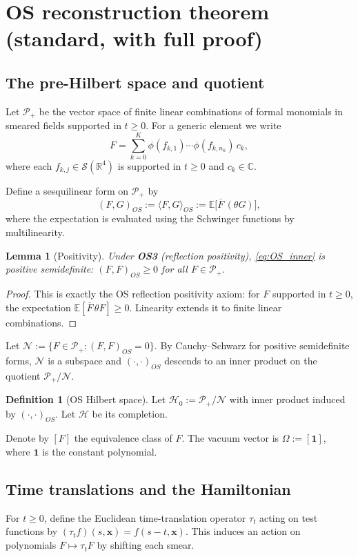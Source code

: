 \documentclass[11pt]{article}
\newtheorem{lemma}[theorem]{Lemma}
\theoremstyle{definition}
\newtheorem{definition}[theorem]{Definition}
\newcommand{\E}{\mathbb{E}}
\newcommand{\1}{\mathbf{1}}
\newcommand{\R}{\mathbb{R}}
\newcommand{\cH}{\mathcal{H}}
\newcommand{\cS}{\mathcal{S}}
\newcommand{\C}{\mathbb{C}}
\newcommand{\cP}{\mathcal{P}}
\begin{document}
\section{OS reconstruction theorem (standard, with full proof)}

\subsection{The pre-Hilbert space and quotient}
Let \(\cP_+\) be the vector space of finite linear combinations of formal monomials in smeared fields supported in \(t\ge 0\). For a generic element we write
\[
F = \sum_{k=0}^K \phi(f_{k,1})\cdots \phi(f_{k,n_k})\, c_k,
\]
where each \(f_{k,j}\in \cS(\R^4)\) is supported in \(t\ge 0\) and \(c_k\in\C\).

Define a sesquilinear form on \(\cP_+\) by
\begin{equation}\label{eq:OS_inner}
(F,G)_{OS} := \langle F,G\rangle_{OS} := \E\big[\overline{F}\, (\theta G)\big],
\end{equation}
where the expectation is evaluated using the Schwinger functions by multilinearity.

\begin{lemma}[Positivity]
Under \textbf{OS3} (reflection positivity), \eqref{eq:OS_inner} is positive semidefinite: \((F,F)_{OS}\ge 0\) for all \(F\in\cP_+\).
\end{lemma}

\begin{proof}
This is exactly the OS reflection positivity axiom: for \(F\) supported in \(t\ge 0\), the expectation \(\E[\overline{F}\, \theta F]\ge 0\). Linearity extends it to finite linear combinations.
\end{proof}

Let \(\mathcal{N}:=\{F\in\cP_+: (F,F)_{OS}=0\}\). By Cauchy--Schwarz for positive semidefinite forms, \(\mathcal{N}\) is a subspace and \((\cdot,\cdot)_{OS}\) descends to an inner product on the quotient \(\cP_+/\mathcal{N}\).

\begin{definition}[OS Hilbert space]
Let \(\cH_0:=\cP_+/\mathcal{N}\) with inner product induced by \((\cdot,\cdot)_{OS}\). Let \(\cH\) be its completion.
\end{definition}

Denote by \([F]\) the equivalence class of \(F\). The vacuum vector is \(\Omega:=[\1]\), where \(\1\) is the constant polynomial.

\subsection{Time translations and the Hamiltonian}
For \(t\ge 0\), define the Euclidean time-translation operator \(\tau_t\) acting on test functions by \((\tau_t f)(s,\mathbf{x}) = f(s-t,\mathbf{x})\). This induces an action on polynomials \(F\mapsto \tau_t F\) by shifting each smear.
\end{document}
